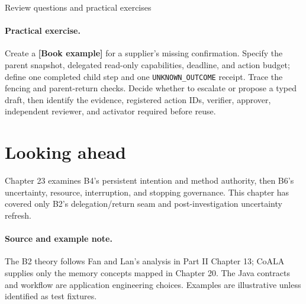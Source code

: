 \begin{reviewquestions}{Review questions and practical exercises}
\paragraph{Practical exercise.} Create a \textbf{[Book example]} for a supplier's missing confirmation. Specify the parent snapshot, delegated read-only capabilities, deadline, and action budget; define one completed child step and one \texttt{UNKNOWN\_\allowbreak OUTCOME} receipt. Trace the fencing and parent-return checks. Decide whether to escalate or propose a typed draft, then identify the evidence, registered action IDs, verifier, approver, independent reviewer, and activator required before reuse.
\end{reviewquestions}

\section*{Looking ahead}

Chapter 23 examines B4's persistent intention and method authority, then B6's uncertainty, resource, interruption, and stopping governance. This chapter has covered only B2's delegation/return seam and post-investigation uncertainty refresh.

\paragraph{Source and example note.} The B2 theory follows Fan and Lan's analysis in Part II Chapter 13; CoALA supplies only the memory concepts mapped in Chapter 20. The Java contracts and workflow are application engineering choices. Examples are illustrative unless identified as test fixtures.
